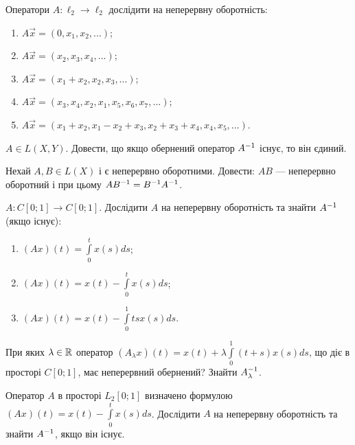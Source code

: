 
\begin{exercise}
    Оператори $A: \ell_2 \to \ell_2$ дослідити на неперервну оборотність:
    \begin{enumerate}
        \item $A\vec{x} = (0, x_1, x_2, ...)$;
        \item $A\vec{x} = (x_2, x_3, x_4, ...)$;
        \item $A\vec{x} = (x_1+x_2, x_2, x_3, ...)$;
        \item $A\vec{x} = (x_3, x_4, x_2, x_1, x_5, x_6, x_7, ...)$;
        \item $A\vec{x} = (x_1+x_2, x_1 - x_2 + x_3, x_2 + x_3 + x_4, x_4, x_5, ...)$.
    \end{enumerate}
\end{exercise}

\begin{exercise}
    $A \in L(X, Y)$. Довести, що якщо обернений оператор $A^{-1}$
    існує, то він єдиний.
\end{exercise}

\begin{exercise}
    Нехай $A, B \in L(X)$ і є неперервно оборотними.
    Довести: $AB$ --- неперервно оборотний і при цьому $AB^{-1} = B^{-1} A^{-1}$.
\end{exercise}

\begin{exercise}
    $A: C[0;1] \to C[0;1]$. Дослідити $A$ на неперервну оборотність та знайти $A^{-1}$ (якщо існує):
    \begin{enumerate}
        \item $(Ax)(t) = \int\limits_0^t x(s)ds$;
        \item $(Ax)(t) = x(t) - \int\limits_0^t x(s)ds$;
        \item $(Ax)(t) = x(t) - \int\limits_0^1 t s x(s) ds$.
    \end{enumerate}
\end{exercise}

\begin{exercise}
    При яких $\lambda \in \mathbb{R}$ оператор $(A_\lambda x)(t) = x(t) + \lambda \int\limits_0^1 (t+s) x(s) ds$,
    що діє в просторі $C[0;1]$, має неперервний обернений? Знайти $A_\lambda^{-1}$.
\end{exercise}

\begin{exercise}
    Оператор $A$ в просторі $L_2 [0;1]$ визначено формулою $(Ax)(t) = x(t) - \int\limits_0^t x(s) ds$.
    Дослідити $A$ на неперервну оборотність та знайти $A^{-1}$, якщо він існує.
\end{exercise}

